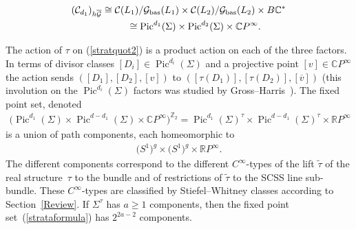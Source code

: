 \documentclass[pdftex]{sigma}
\numberwithin{equation}{section}
\begin{document}
\begin{gather*} ({\mathcal C}_{d_1})_{h\overline{{\mathcal G}}} \cong {\mathcal C}(L_1)/ {\mathcal G}_{\rm bas}(L_1) \times {\mathcal C}(L_2)/ {\mathcal G}_{\rm bas}(L_2) \times B {\mathbb C}^*\\
\hphantom{({\mathcal C}_{d_1})_{h\overline{{\mathcal G}}} }{} \cong \operatorname{Pic}^{d_1}(\Sigma) \times \operatorname{Pic}^{d_2}(\Sigma) \times {\mathbb C} P^{\infty}.
\end{gather*}

The action of $\tau$ on (\ref{stratquot2}) is a product action on each of the three factors. In terms of divisor classes $[D_i] \in \operatorname{Pic}^{d_i}(\Sigma)$ and a projective point $[v] \in {\mathbb C} P^{\infty}$ the action sends $ ([D_1], [D_2], [v])$ to $([\tau(D_1)], [\tau(D_2)], [\overline{v}])$ (this involution on the $\operatorname{Pic}^{d_i}(\Sigma)$ factors was studied by Gross--Harris~\cite{GH2}). The f\/ixed point set, denoted
\begin{gather}\label{strataformula}
\big(\operatorname{Pic}^{d_1}(\Sigma) \times \operatorname{Pic}^{d - d_1}(\Sigma) \times {\mathbb C} P^{\infty}\big)^{{\mathbb Z}_2} = \operatorname{Pic}^{d_1}(\Sigma)^{\tau} \times \operatorname{Pic}^{d - d_1}(\Sigma)^{\tau} \times {\mathbb R} P^{\infty}
\end{gather}
is a union of path components, each homeomorphic to
\begin{gather*} \big(S^1\big)^g \times \big(S^1\big)^g \times {\mathbb R} P^{\infty}.\end{gather*}
The dif\/ferent components correspond to the dif\/ferent $C^{\infty}$-types of the lift $\tilde{\tau}$ of the real struc\-tu\-re~$\tau$ to the bundle and of restrictions of $\tilde{\tau}$ to the SCSS line sub-bundle. These $C^{\infty}$-types are classif\/ied by Stiefel--Whitney classes according to Section~\ref{Review}. If $\Sigma^{\tau}$ has $a \geq 1$ components, then the f\/ixed point set~(\ref{strataformula}) has $2^{2a-2}$ components.
\end{document}
